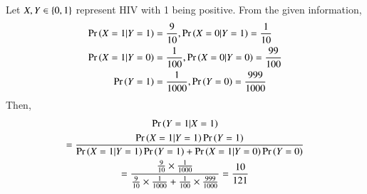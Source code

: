 Let $X,Y \in \left\{0,1\right\}$ represent HIV with 1 being positive.  From the given information,
{\small
\begin{align}
\Pr\left(X = 1|Y=1\right) &= \frac{9}{10},\Pr\left(X = 0|Y=1\right) = \frac{1}{10}
\\
\Pr\left(X = 1|Y=0\right) &= \frac{1}{100},
\Pr\left(X = 0|Y=0\right) = \frac{99}{100}
\\
\Pr\left(Y=1\right) &= \frac{1}{1000},
\Pr\left(Y=0\right) = \frac{999}{1000}
\end{align}
}
Then, 
{\tiny
\begin{multline}
\Pr\left(Y=1|X=1\right) 
\\
= \frac{\Pr\left(X=1|Y=1\right)\Pr\left(Y=1\right)}{\Pr\left(X=1|Y=1\right)\Pr\left(Y=1\right)+\Pr\left(X=1|Y=0\right)\Pr\left(Y=0\right)}
\\
=\frac{\frac{9}{10}\times \frac{1}{1000}}{\frac{9}{10}\times \frac{1}{1000}+\frac{1}{100}\times \frac{999}{1000}}
=\frac{10}{121}
\end{multline}
}

